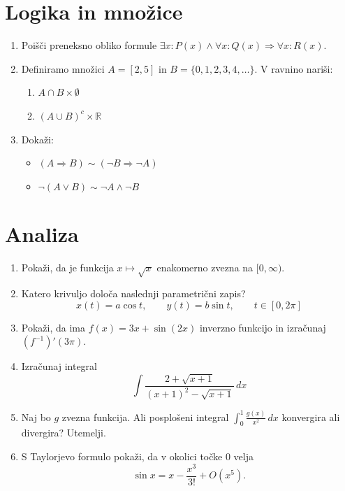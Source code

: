 \documentclass[a4paper,12pt]{article}
\begin{document}
\section*{Logika in množice}

\begin{enumerate}
    \item
    Poišči preneksno obliko formule
    $\exists x:P(x)\land\forall x:Q(x)\Rightarrow\forall x:R(x)$.

    \item
    Definiramo množici $A=[2,5]$ in
    $B=\{0,1,2,3,4,\ldots\}$.
    V ravnino nariši:
    \begin{enumerate}
        \item $A\cap B\times\emptyset$
        \item $(A\cup B)^c\times\mathbb{R}$
    \end{enumerate}

    \item
    Dokaži:
    \begin{itemize}
        \item $(A\Rightarrow B)\sim(\neg B\Rightarrow\neg A)$
        \item $\neg(A\lor B)\sim\neg A\land\neg B$
    \end{itemize}
\end{enumerate}

\section*{Analiza}

\begin{enumerate}
    \item
    Pokaži, da je funkcija
    $x\mapsto\sqrt{x}$
    enakomerno zvezna na $[0,\infty)$.

    \item
    Katero krivuljo določa naslednji parametrični zapis?
    \[
    x(t)=a\cos t,\qquad
    y(t)=b\sin t,\qquad
    t\in[0,2\pi]
    \]

    \item
    Pokaži, da ima
    $f(x)=3x+\sin(2x)$
    inverzno funkcijo in izračunaj
    $(f^{-1})'(3\pi)$.

    \item
    Izračunaj integral
    \[
    \int\frac{2+\sqrt{x+1}}
    {(x+1)^2-\sqrt{x+1}}\,dx
    \]

    \item
    Naj bo $g$ zvezna funkcija.
    Ali posplošeni integral
    $\int_0^1\frac{g(x)}{x^2}\,dx$
    konvergira ali divergira?
    Utemelji.

    \item
    S Taylorjevo formulo pokaži, da v okolici točke
    $0$ velja
    \[
    \sin x=x-\frac{x^3}{3!}+O(x^5).
    \]
\end{enumerate}
\end{document}
